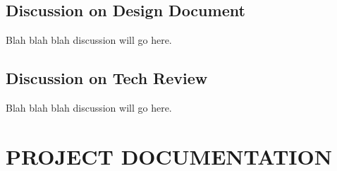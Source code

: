 \documentclass[draftclsnofoot,10pt,onecolumn]{IEEEtran} %
\begin{document}



\subsection{Discussion on Design Document}
Blah blah blah discussion will go here.




\subsection{Discussion on Tech Review}
Blah blah blah discussion will go here.








\section{PROJECT DOCUMENTATION}

\iffalse
\end{document}
